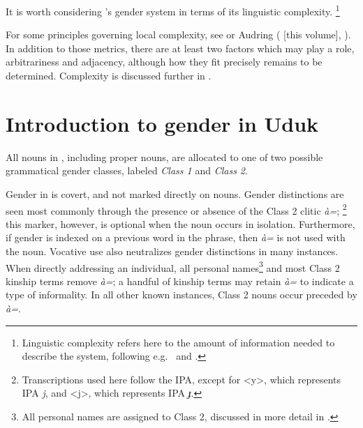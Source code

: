 \documentclass[output=collectionpaper,hidelinks]{langscibook}
\theoremstyle{remark}
\begin{document}
It is worth considering 's gender system in terms of its linguistic
complexity.%
\footnote{Linguistic complexity refers here to the amount of
information needed to describe the system, following e.g.\ \citet{Dahl2004} and \citet{Miestamo2008}.} %

For some principles governing local complexity, see \citet[50]{DiGarbo2016} or Audring (\citeyear{Audringthisyear} [this volume], ). In addition to those metrics, there are at least two factors which may play a role, arbitrariness and adjacency, although how they fit precisely remains to be determined. Complexity is discussed further in .

\section{Introduction to gender in Uduk}
\label{sec:Introduction_to_gender_in_Uduk}
\largerpage
All nouns in , including proper nouns, are allocated to one of two
possible grammatical gender classes, labeled \emph{Class 1} and \emph{Class
2}.

Gender in  is covert, and not marked directly on nouns. Gender distinctions
are seen most commonly through the presence or absence of the Class 2 clitic
\emph{à=};%
\footnote{Transcriptions used here follow the IPA, except for <y>, which
represents IPA \emph{j}, and <j>, which represents IPA \emph{ɟ}.} %
this marker, however, is optional when the noun occurs in isolation. Furthermore, if gender is indexed on a previous word in the phrase, then \emph{à=} is not used with the noun.  Vocative use also neutralizes gender distinctions in many instances.
When directly addressing an individual, all personal names\footnote{All personal
names are assigned to Class 2, discussed in more detail in
.} and most Class 2 kinship terms remove \emph{à=}; a
handful of kinship terms may retain \emph{à=} to indicate a type of
informality.  In all other known instances, Class 2 nouns occur preceded by \emph{à=}.
\end{document}
